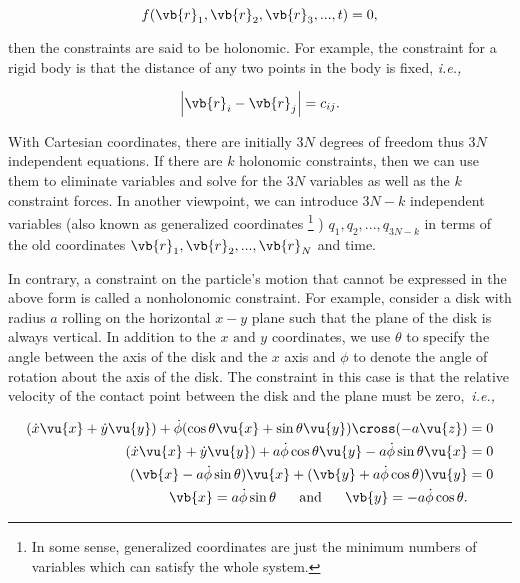 \documentclass[a4paper,12pt]{report}
\begin{document}
\begin{equation}
	f(\vb{r} _{1} , \vb{r} _{2} , \vb{r} _{3} , ..., t) = 0,
\end{equation}

then the constraints are said to be holonomic. For example, the constraint for a rigid body is that the distance of any two points in the body is fixed, \textit{i.e.,} 

\begin{equation}
	\left| \vb{r} _{i} - \vb{r} _{j}  \right| = c_{ij} .
\end{equation}

With Cartesian coordinates, there are initially \(3N\) degrees of freedom thus \(3N\) independent equations. If there are \(k\) holonomic constraints, then we can use them to eliminate variables and solve for the \(3N\) variables as well as the \(k\) constraint forces. In another viewpoint, we can introduce \(3N - k\) independent variables (also known as generalized coordinates \footnote{In some sense, generalized coordinates are just the minimum numbers of variables which can satisfy the whole system.} ) \(q_{1} , q_{2}, ...,q_{3N - k} \) in terms of the old coordinates \(\vb{r} _{1} , \vb{r} _{2} , ..., \vb{r} _{N} \) and time.  

In contrary, a constraint on the particle's motion that cannot be expressed in the above form is called a nonholonomic constraint. For example, consider a disk with radius \(a\) rolling on the horizontal \(x-y\) plane such that the plane of the disk is always vertical. In addition to the \(x \text{ and }  y\) coordinates, we use \(\theta \) to specify the angle between the axis of the disk and the \(x\) axis and \(\phi \) to denote the angle of rotation about the axis of the disk. The constraint in this case is that the relative velocity of the contact point between the disk and the plane must be zero, \textit{i.e.,} 

\begin{equation}
\begin{aligned}
	(\dot{x} \vu{x} + \dot{y} \vu{y} ) + \dot{\phi } (\cos \theta \vu{x} + \sin \theta \vu{y} ) \cross (-a\vu{z} ) &= 0 \\
	(\dot{x} \vu{x} + \dot{y} \vu{y} ) + a\dot{\phi } \cos \theta \vu{y} - a\dot{\phi } \sin \theta \vu{x} &= 0 \\
	(\vb{x} - a\dot{\phi } \sin \theta) \vu{x} + (\vb{y} + a\dot{\phi } \cos \theta)\vu{y} &= 0 \\
	\vb{x} = a\dot{\phi } \sin \theta ~~~~\text{ and }~~~~ \vb{y} = -a\dot{\phi } \cos \theta.
\end{aligned}
\end{equation}
\end{document}
